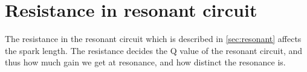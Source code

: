 \section{Resistance in resonant circuit}
The resistance in the resonant circuit which is described in \cref{sec:resonant} affects the spark length. The resistance decides the Q value of the resonant circuit, and thus how much gain we get at resonance, and how distinct the resonance is.

\section{}
